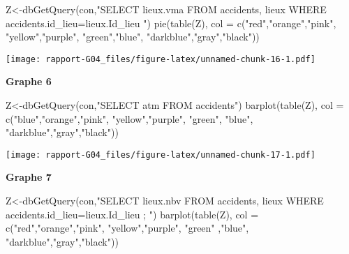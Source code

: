 \documentclass[mstat,12pt]{unswthesis}
\newenvironment{Shaded}{\begin{snugshade}}{\end{snugshade}}
\newcommand{\AttributeTok}[1]{\textcolor[rgb]{0.77,0.63,0.00}{#1}}
\newcommand{\FunctionTok}[1]{\textcolor[rgb]{0.00,0.00,0.00}{#1}}
\newcommand{\NormalTok}[1]{#1}
\newcommand{\OtherTok}[1]{\textcolor[rgb]{0.56,0.35,0.01}{#1}}
\newcommand{\StringTok}[1]{\textcolor[rgb]{0.31,0.60,0.02}{#1}}
\begin{document}
\begin{Shaded}
\begin{Highlighting}[]
\NormalTok{Z}\OtherTok{\textless{}{-}}\FunctionTok{dbGetQuery}\NormalTok{(con,}\StringTok{"SELECT lieux.vma FROM accidents,}
\StringTok{lieux WHERE accidents.id\_lieu=lieux.Id\_lieu }
\StringTok{"}\NormalTok{)}
\FunctionTok{pie}\NormalTok{(}\FunctionTok{table}\NormalTok{(Z), }\AttributeTok{col =} \FunctionTok{c}\NormalTok{(}\StringTok{"red"}\NormalTok{,}\StringTok{"orange"}\NormalTok{,}\StringTok{"pink"}\NormalTok{, }\StringTok{"yellow"}\NormalTok{,}\StringTok{"purple"}\NormalTok{,}
                      \StringTok{"green"}\NormalTok{,}\StringTok{"blue"}\NormalTok{, }\StringTok{"darkblue"}\NormalTok{,}\StringTok{"gray"}\NormalTok{,}\StringTok{"black"}\NormalTok{))}
\end{Highlighting}
\end{Shaded}

\texttt{[image: rapport-G04\_files/figure-latex/unnamed-chunk-16-1.pdf]}

\medskip

\textbf{Graphe 6 }

\begin{Shaded}
\begin{Highlighting}[]
\NormalTok{Z}\OtherTok{\textless{}{-}}\FunctionTok{dbGetQuery}\NormalTok{(con,}\StringTok{"SELECT atm}
\StringTok{FROM accidents"}\NormalTok{)}
\FunctionTok{barplot}\NormalTok{(}\FunctionTok{table}\NormalTok{(Z), }\AttributeTok{col =} \FunctionTok{c}\NormalTok{(}\StringTok{"blue"}\NormalTok{,}\StringTok{"orange"}\NormalTok{,}\StringTok{"pink"}\NormalTok{, }\StringTok{"yellow"}\NormalTok{,}\StringTok{"purple"}\NormalTok{, }\StringTok{"green"}\NormalTok{,}
                          \StringTok{"blue"}\NormalTok{, }\StringTok{"darkblue"}\NormalTok{,}\StringTok{"gray"}\NormalTok{,}\StringTok{"black"}\NormalTok{))}
\end{Highlighting}
\end{Shaded}

\texttt{[image: rapport-G04\_files/figure-latex/unnamed-chunk-17-1.pdf]}

\medskip

\textbf{Graphe 7 }

\begin{Shaded}
\begin{Highlighting}[]
\NormalTok{Z}\OtherTok{\textless{}{-}}\FunctionTok{dbGetQuery}\NormalTok{(con,}\StringTok{"SELECT lieux.nbv FROM accidents,}
\StringTok{lieux WHERE accidents.id\_lieu=lieux.Id\_lieu ;}
\StringTok{"}\NormalTok{)}
\FunctionTok{barplot}\NormalTok{(}\FunctionTok{table}\NormalTok{(Z), }\AttributeTok{col =} \FunctionTok{c}\NormalTok{(}\StringTok{"red"}\NormalTok{,}\StringTok{"orange"}\NormalTok{,}\StringTok{"pink"}\NormalTok{, }\StringTok{"yellow"}\NormalTok{,}\StringTok{"purple"}\NormalTok{, }\StringTok{"green"}
\NormalTok{                        ,}\StringTok{"blue"}\NormalTok{, }\StringTok{"darkblue"}\NormalTok{,}\StringTok{"gray"}\NormalTok{,}\StringTok{"black"}\NormalTok{))}
\end{Highlighting}
\end{Shaded}
\end{document}
